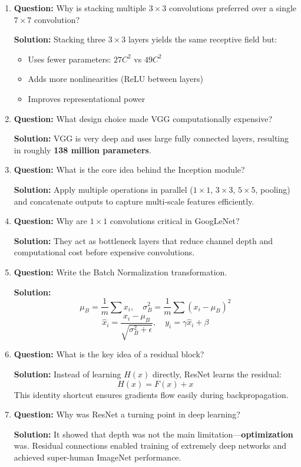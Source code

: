 \documentclass{article}
\begin{document}
\begin{enumerate}

\item \textbf{Question:}
Why is stacking multiple $3\times3$ convolutions preferred over a single $7\times7$ convolution?

\textbf{Solution:}
Stacking three $3\times3$ layers yields the same receptive field but:
\begin{itemize}
\item Uses fewer parameters: $27C^2$ vs $49C^2$
\item Adds more nonlinearities (ReLU between layers)
\item Improves representational power
\end{itemize}

\item \textbf{Question:}
What design choice made VGG computationally expensive?

\textbf{Solution:}
VGG is very deep and uses large fully connected layers, resulting in roughly \textbf{138 million parameters}.

\item \textbf{Question:}
What is the core idea behind the Inception module?

\textbf{Solution:}
Apply multiple operations in parallel ($1\times1$, $3\times3$, $5\times5$, pooling) and concatenate outputs to capture multi-scale features efficiently.

\item \textbf{Question:}
Why are $1\times1$ convolutions critical in GoogLeNet?

\textbf{Solution:}
They act as bottleneck layers that reduce channel depth and computational cost before expensive convolutions.

\item \textbf{Question:}
Write the Batch Normalization transformation.

\textbf{Solution:}
\[
\mu_B=\frac{1}{m}\sum x_i,\quad
\sigma_B^2=\frac{1}{m}\sum (x_i-\mu_B)^2
\]
\[
\hat{x}_i=\frac{x_i-\mu_B}{\sqrt{\sigma_B^2+\epsilon}},\quad
y_i=\gamma \hat{x}_i+\beta
\]

\item \textbf{Question:}
What is the key idea of a residual block?

\textbf{Solution:}
Instead of learning $H(x)$ directly, ResNet learns the residual:
\[
H(x)=F(x)+x
\]
This identity shortcut ensures gradients flow easily during backpropagation.

\item \textbf{Question:}
Why was ResNet a turning point in deep learning?

\textbf{Solution:}
It showed that depth was not the main limitation—\textbf{optimization} was.  
Residual connections enabled training of extremely deep networks and achieved super-human ImageNet performance.

\end{enumerate}
\end{document}
